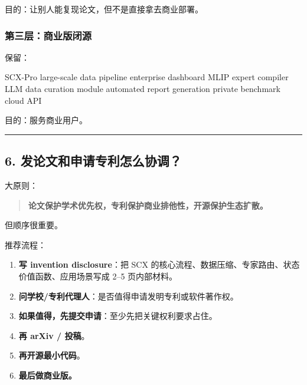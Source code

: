 \documentclass[
  12pt,
]{ctexart}
\newenvironment{Shaded}{}{}
\newcommand{\NormalTok}[1]{#1}
\providecommand{\tightlist}{%
  \setlength{\itemsep}{0pt}\setlength{\parskip}{0pt}}
\begin{document}
目的：让别人能复现论文，但不是直接拿去商业部署。

\subsubsection{第三层：商业版闭源}\label{ux7b2cux4e09ux5c42ux5546ux4e1aux7248ux95edux6e90}

保留：

\begin{Shaded}
\begin{Highlighting}[]
\NormalTok{SCX{-}Pro}
\NormalTok{  large{-}scale data pipeline}
\NormalTok{  enterprise dashboard}
\NormalTok{  MLIP expert compiler}
\NormalTok{  LLM data curation module}
\NormalTok{  automated report generation}
\NormalTok{  private benchmark}
\NormalTok{  cloud API}
\end{Highlighting}
\end{Shaded}

目的：服务商业用户。

\begin{center}\rule{0.5\linewidth}{0.5pt}\end{center}

\subsection{6.
发论文和申请专利怎么协调？}\label{ux53d1ux8bbaux6587ux548cux7533ux8bf7ux4e13ux5229ux600eux4e48ux534fux8c03}

大原则：

\begin{quote}
\textbf{论文保护学术优先权，专利保护商业排他性，开源保护生态扩散。}
\end{quote}

但顺序很重要。

推荐流程：

\begin{enumerate}
\def\labelenumi{\arabic{enumi}.}
\tightlist
\item
  \textbf{写 invention disclosure}：把 SCX
  的核心流程、数据压缩、专家路由、状态价值函数、应用场景写成 2--5
  页内部材料。
\item
  \textbf{问学校/专利代理人}：是否值得申请发明专利或软件著作权。
\item
  \textbf{如果值得，先提交申请}：至少先把关键权利要求占住。
\item
  \textbf{再 arXiv / 投稿}。
\item
  \textbf{再开源最小代码}。
\item
  \textbf{最后做商业版。}
\end{enumerate}
\end{document}
